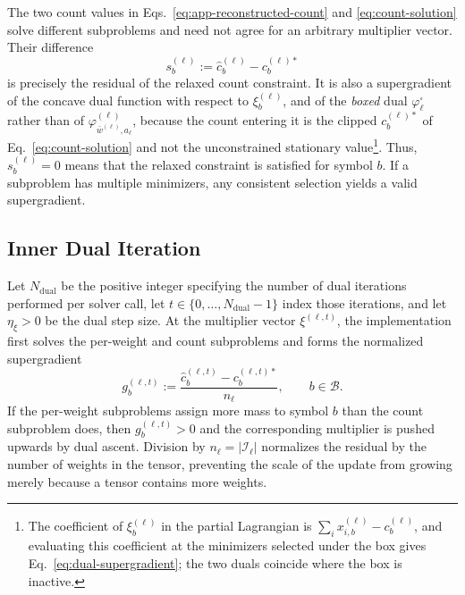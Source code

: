 \documentclass{article}
\begin{document}
The two count values in Eqs.~\eqref{eq:app-reconstructed-count} and
\eqref{eq:count-solution} solve different subproblems and need not agree for an
arbitrary multiplier vector. Their difference
\begin{equation}
  s_b^{(\ell)}
  :=
  \widehat c_b^{(\ell)}-c_b^{(\ell)*}
  \label{eq:dual-supergradient}
\end{equation}
is precisely the residual of the relaxed count constraint. It is also a
supergradient of the concave dual function with respect to $\xi_b^{(\ell)}$, and
of the \emph{boxed} dual $\varphi_\ell^{\square}$ rather than of
$\varphi_{\bar w^{(\ell)},a_\ell}^{(\ell)}$, because the count entering it is the
clipped $c_b^{(\ell)*}$ of Eq.~\eqref{eq:count-solution} and not the unconstrained
stationary value\footnote{The coefficient of $\xi_b^{(\ell)}$ in the partial
Lagrangian is $\sum_i x_{i,b}^{(\ell)}-c_b^{(\ell)}$, and evaluating this coefficient at
the minimizers selected under the box gives Eq.~\eqref{eq:dual-supergradient};
the two duals coincide where the box is inactive.}. Thus,
$s_b^{(\ell)}=0$ means that the relaxed constraint is satisfied for symbol
$b$. If a subproblem has multiple minimizers, any consistent selection yields
a valid supergradient.


\subsection{Inner Dual Iteration}
\label{app:dual-iteration}

Let $N_{\mathrm{dual}}$ be the positive integer specifying the number of dual
iterations performed per solver call, let
$t\in\{0,\ldots,N_{\mathrm{dual}}-1\}$ index those iterations, and let
$\eta_\xi>0$ be the dual step size. At the multiplier vector
$\xi^{(\ell,t)}$, the implementation
first solves the per-weight and count subproblems and forms the normalized
supergradient
\begin{equation}
  g_b^{(\ell,t)}
  :=
  \frac{
    \widehat c_b^{(\ell,t)}
    -c_b^{(\ell,t)*}
  }{n_\ell},
  \qquad b\in\mathcal B.
  \label{eq:app-normalized-dual-supergradient}
\end{equation}
If the per-weight subproblems assign more mass to symbol $b$ than the count subproblem
does, then $g_b^{(\ell,t)}>0$ and the corresponding multiplier is pushed
upwards by dual ascent. Division by
$n_\ell=|\mathcal I_\ell|$ normalizes the residual by the number of weights in
the tensor, preventing the scale of the update from growing merely because a
tensor contains more weights.
\end{document}
